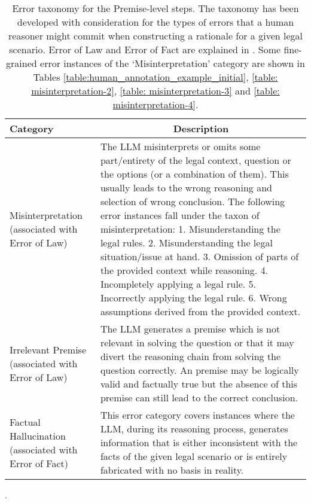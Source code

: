 \begin{table*}[ht]
\small
\centering
\begin{tabular}{p{4cm}|p{11cm}}
\toprule
\textbf{Category}                               & \multicolumn{1}{c}{\textbf{Description}}                                     \\ \midrule
Misinterpretation (associated with Error of Law)                               & The LLM misinterprets or omits some part/entirety of the legal context, question or the options (or a combination of them). This usually leads to the wrong reasoning and selection of wrong conclusion. The following error instances fall under the taxon of misinterpretation: 1. Misunderstanding the legal rules. 2. Misunderstanding the legal situation/issue at hand. 3. Omission of parts of the provided context while reasoning. 4. Incompletely applying a legal rule. 5. Incorrectly applying the legal rule. 6. Wrong assumptions derived from the provided context.                                                                             \\ \midrule
Irrelevant Premise (associated with Error of Law)                             & The LLM generates a premise which is not relevant in solving the question or that it may divert the reasoning chain from solving the question correctly. An premise may be logically valid and factually true but the absence of this premise can still lead to the correct conclusion.                         \\ \midrule
Factual Hallucination (associated with Error of Fact)                          & This error category covers instances where the LLM, during its reasoning process, generates information that is either inconsistent with the facts of the given legal scenario or is entirely fabricated with no basis in reality.                                                                                                                \\ \bottomrule
\end{tabular}
\caption{Error taxonomy for the Premise-level steps. The taxonomy has been developed with consideration for the types of errors that a human reasoner might commit when constructing a rationale for a given legal scenario. Error of Law and Error of Fact are explained in \citep{cornell2024mistake, cornell2024mistake_fact, oreilly2012errors, wilberg2023mistake}. Some fine-grained error instances of the `Misinterpretation' category are shown in Tables \ref{table:human_annotation_example_initial}, \ref{table: misinterpretation-2}, \ref{table: misinterpretation-3} and \ref{table: misinterpretation-4}.}.
\label{table:premise_errors}
\end{table*}